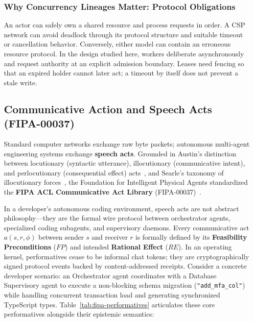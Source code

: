 \subsubsection{Why Concurrency Lineages Matter: Protocol Obligations}
\label{sec:why-concurrency-matters}

An actor can safely own a shared resource and process requests in order. A CSP network can avoid deadlock through its protocol structure and suitable timeout or cancellation behavior. Conversely, either model can contain an erroneous resource protocol. In the design studied here, workers deliberate asynchronously and request authority at an explicit admission boundary. Leases need fencing so that an expired holder cannot later act; a timeout by itself does not prevent a stale write.

\subsection{Communicative Action and Speech Acts (FIPA-00037)}

Standard computer networks exchange raw byte packets; autonomous multi-agent engineering systems exchange \textbf{speech acts}. Grounded in Austin's distinction between locutionary (syntactic utterance), illocutionary (communicative intent), and perlocutionary (consequential effect) acts~, and Searle's taxonomy of illocutionary forces~, the Foundation for Intelligent Physical Agents standardized the \textbf{FIPA ACL Communicative Act Library} (FIPA-00037)~.

In a developer's autonomous coding environment, speech acts are not abstract philosophy---they are the formal wire protocol between orchestrator agents, specialized coding subagents, and supervisory daemons. Every communicative act $a(s, r, \phi)$ between sender $s$ and receiver $r$ is formally defined by its \textbf{Feasibility Preconditions} ($FP$) and intended \textbf{Rational Effect} ($RE$). In an operating kernel, performatives cease to be informal chat tokens; they are cryptographically signed protocol events backed by content-addressed receipts. Consider a concrete developer scenario: an Orchestrator agent coordinates with a Database Supervisory agent to execute a non-blocking schema migration (\texttt{"add\_mfa\_col"}) while handling concurrent transaction load and generating synchronized TypeScript types. Table~\ref{tab:fipa-performatives} articulates these core performatives alongside their epistemic semantics:

